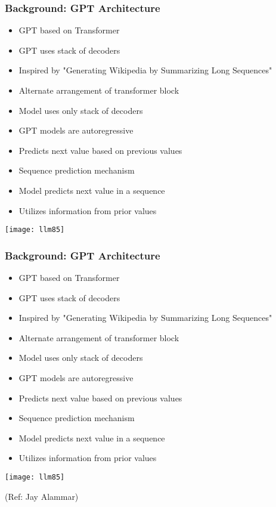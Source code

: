 \begin{frame}[fragile]\frametitle{Background: GPT Architecture}

\begin{itemize}
        \item GPT based on Transformer
        \item GPT uses stack of decoders
        \item Inspired by "Generating Wikipedia by Summarizing Long Sequences"
        \item Alternate arrangement of transformer block
        \item Model uses only stack of decoders
        \item GPT models are autoregressive
        \item Predicts next value based on previous values
        \item Sequence prediction mechanism
        \item Model predicts next value in a sequence
        \item Utilizes information from prior values		
\end{itemize}	

\begin{center}
\texttt{[image: llm85]}
\end{center}		

\end{frame}

\begin{frame}[fragile]\frametitle{Background: GPT Architecture}

\begin{itemize}
        \item GPT based on Transformer
        \item GPT uses stack of decoders
        \item Inspired by "Generating Wikipedia by Summarizing Long Sequences"
        \item Alternate arrangement of transformer block
        \item Model uses only stack of decoders
        \item GPT models are autoregressive
        \item Predicts next value based on previous values
        \item Sequence prediction mechanism
        \item Model predicts next value in a sequence
        \item Utilizes information from prior values		
\end{itemize}	

\begin{center}
\texttt{[image: llm85]}
\end{center}		

{\tiny (Ref: Jay Alammar)}

\end{frame}


